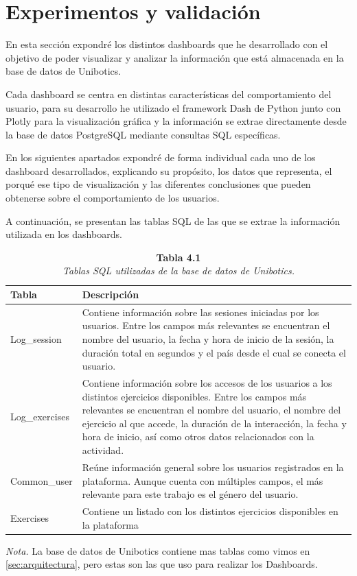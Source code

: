 \documentclass[a4paper, 12pt]{book}
\begin{document}
\chapter{Experimentos y validación}
\label{chap:experimentos}

En esta sección expondré los distintos dashboards que he desarrollado con el objetivo de poder visualizar y analizar la información que está almacenada en la base de datos de Unibotics.

Cada dashboard se centra en distintas características del comportamiento del usuario, para su desarrollo he utilizado el framework Dash de Python junto con Plotly para la visualización gráfica y la información se extrae directamente desde la base de datos PostgreSQL mediante consultas SQL específicas.

En los siguientes apartados expondré de forma individual cada uno de los dashboard desarrollados, explicando su propósito, los datos que representa, el porqué ese tipo de visualización y las diferentes conclusiones que pueden obtenerse sobre el comportamiento de los usuarios.

A continuación, se presentan las tablas SQL de las que se extrae la información utilizada en los dashboards.

\begin{table}[H]
\centering
\caption*{\textbf{Tabla 4.1} \\
\textit{Tablas SQL utilizadas de la base de datos de Unibotics.}}
\begin{tabular}{lp{10cm}}
\toprule
\textbf{Tabla} & \textbf{Descripción} \\
\midrule
Log\_session & Contiene información sobre las sesiones iniciadas por los usuarios. Entre los campos más relevantes se encuentran el nombre del usuario, la fecha y hora de inicio de la sesión, la duración total en segundos y el país desde el cual se conecta el usuario. \\
Log\_exercises & Contiene información sobre los accesos de los usuarios a los distintos ejercicios disponibles. Entre los campos más relevantes se encuentran el nombre del usuario, el nombre del ejercicio al que accede, la duración de la interacción, la fecha y hora de inicio, así como otros datos relacionados con la actividad. \\
Common\_user & Reúne información general sobre los usuarios registrados en la plataforma. Aunque cuenta con múltiples campos, el más relevante para este trabajo es el género del usuario. \\
Exercises & Contiene un listado con los distintos ejercicios disponibles en la plataforma \\
\bottomrule
\end{tabular}
\vspace{1ex}

\begin{flushleft}
\textit{Nota.} La base de datos de Unibotics contiene mas tablas como vimos en \ref{sec:arquitectura}, pero estas son las que uso para realizar los Dashboards.
\end{flushleft}
\end{table}
\end{document}
